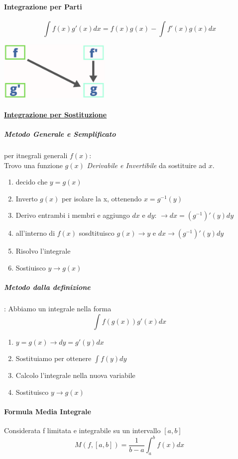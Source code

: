 \documentclass[12pt, a4paper, openany]{book}
\begin{document}
\paragraph*{Integrazione per Parti}
$$\int f(x)g'(x)dx = f(x)g(x)-\int f'(x)g(x)dx$$
\begin{center}
	\includegraphics[width=0.4\textwidth]{integrazione-per-parti.png}
\end{center}

\paragraph*{\underline{Integrazione per Sostituzione}}
\subparagraph*{\emph{Metodo Generale e Semplificato}} per itnegrali generali $f(x)$:
\\Trovo una funzione $g(x)$ \emph{Derivabile e Invertibile} da sostituire ad $x$.
\begin{enumerate}
	\item decido che $y=g(x)$
	\item Inverto $g(x)$ per isolare la x, ottenendo $x=g^{-1}(y)$
	\item Derivo entrambi i membri e aggiungo $dx$ e $dy$: $\to dx=(g^{-1})'(y)dy$
	\item all'interno di $f(x)$ sosdtituisco $g(x) \to y$ e $dx \to (g^{-1})'(y)dy$
	\item Risolvo l'integrale
	\item Sostiuisco $y \to g(x)$
\end{enumerate}
\subparagraph*{Metodo dalla definizione}: Abbiamo un integrale nella forma
$$\int f(g(x))g'(x) dx$$
\begin{enumerate}
	\item $y=g(x)\to dy=g'(y)dx$
	\item Sostituiamo per ottenere $\int f(y)dy$
	\item Calcolo l'integrale nella nuova variabile
	\item Sostituisco $y\to g(x)$
\end{enumerate}

\paragraph*{Formula Media Integrale}
Considerata f limitata e integrabile su un intervallo $[a,b]$
\begin{equation*}
	M(f,[a,b])=\frac{1}{b-a}\int_a^b f(x)dx
\end{equation*}
\end{document}
